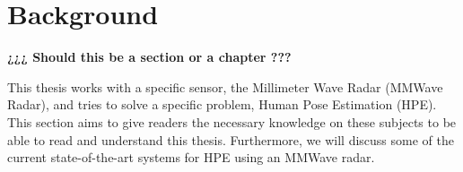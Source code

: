 \chapter{Background}
\label{chapter: background}


\textbf{¿¿¿ Should this be a section or a chapter ???}

This thesis works with a specific sensor, the Millimeter Wave Radar (MMWave Radar), and tries to solve a specific problem, Human Pose Estimation (HPE). 
This section aims to give readers the necessary knowledge on these subjects to be able to read and understand this thesis.
Furthermore, we will discuss some of the current state-of-the-art systems for HPE using an MMWave radar.






